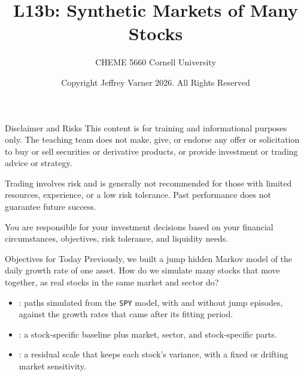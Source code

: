 \documentclass[aspectratio=169,11pt]{beamer}
\title{\texorpdfstring{{\vnheavy L13b}}{L13b}: Synthetic Markets of Many Stocks}
\subtitle{CHEME 5660 Cornell University}
\author{Copyright Jeffrey Varner 2026. All Rights Reserved}
\begin{document}
\vntitlepage

\begin{frame}{Disclaimer and Risks}
  \vspace{0.6em}
  \textbf{} This content is for training and informational
  purposes only. The teaching team does not make, give, or endorse any offer or
  solicitation to buy or sell securities or derivative products, or provide
  investment or trading advice or strategy.

  \vspace{1.1em}
  \textbf{} Trading involves risk and is generally not recommended for
  those with limited resources, experience, or a low risk tolerance. Past
  performance does not guarantee future success.

  \vspace{1.1em}
  \textbf{} You are responsible for your investment decisions
  based on your financial circumstances, objectives, risk tolerance, and
  liquidity needs.
\end{frame}

\begin{frame}{Objectives for Today}
  Previously, we built a jump hidden Markov model of the daily growth rate of one asset.
  How do we simulate many stocks that move together, as real stocks in the same market
  and sector do?

  \vspace{0.5em}
  {\large\textbf{}}
  \begin{itemize}\setlength{\itemsep}{0.4em}
    \item {}: paths simulated from the \texttt{SPY} model, with
      and without jump episodes, against the growth rates that came after its fitting period.
    \item {}: a stock-specific baseline plus market,
      sector, and stock-specific parts.
    \item {}: a residual scale that keeps each stock's
      variance, with a fixed or drifting market sensitivity.
  \end{itemize}
\end{frame}
\end{document}
